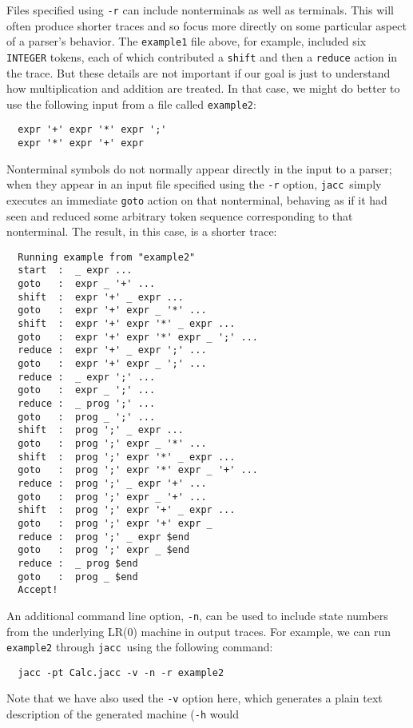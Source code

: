 \documentclass[12pt]{article}
\def\jacc{{\tt jacc}}
\begin{document}
Files specified using \verb"-r" can include
nonterminals as well as terminals.  This will often
produce shorter traces and so focus more directly on some particular
aspect of a parser's behavior.  The \verb"example1" file above, for
example, included six \verb"INTEGER" tokens, each of which contributed
a \verb"shift" and then a \verb"reduce" action in the
trace.  But these details are not important if our goal is
just to understand how multiplication and addition are treated.  In
that case, we might do better to use the following input from a
file called \verb"example2":
{\small
\begin{verbatim}
  expr '+' expr '*' expr ';'
  expr '*' expr '+' expr
\end{verbatim}
}%
Nonterminal symbols do not normally appear directly in the input
to a parser; when they appear in an input file specified using the
\verb"-r" option, \jacc\ simply executes an immediate \verb"goto"
action on that nonterminal, behaving as if it had seen and reduced
some arbitrary token sequence corresponding to that nonterminal.
The result, in this case, is a shorter trace:
{\small
\begin{verbatim}
  Running example from "example2"
  start  :  _ expr ...
  goto   :  expr _ '+' ...
  shift  :  expr '+' _ expr ...
  goto   :  expr '+' expr _ '*' ...
  shift  :  expr '+' expr '*' _ expr ...
  goto   :  expr '+' expr '*' expr _ ';' ...
  reduce :  expr '+' _ expr ';' ...
  goto   :  expr '+' expr _ ';' ...
  reduce :  _ expr ';' ...
  goto   :  expr _ ';' ...
  reduce :  _ prog ';' ...
  goto   :  prog _ ';' ...
  shift  :  prog ';' _ expr ...
  goto   :  prog ';' expr _ '*' ...
  shift  :  prog ';' expr '*' _ expr ...
  goto   :  prog ';' expr '*' expr _ '+' ...
  reduce :  prog ';' _ expr '+' ...
  goto   :  prog ';' expr _ '+' ...
  shift  :  prog ';' expr '+' _ expr ...
  goto   :  prog ';' expr '+' expr _
  reduce :  prog ';' _ expr $end
  goto   :  prog ';' expr _ $end
  reduce :  _ prog $end
  goto   :  prog _ $end
  Accept!
\end{verbatim}
}%
An additional command line option, \verb"-n", can be used to include 
state numbers from the underlying LR(0) machine in output traces.
For example, we can run \verb"example2" through \jacc\ using the
following command:
{\small
\begin{verbatim}
  jacc -pt Calc.jacc -v -n -r example2
\end{verbatim}
}%
Note that we have also used the \verb"-v" option here, which generates
a plain text description of the generated machine (\verb"-h" would
\end{document}
